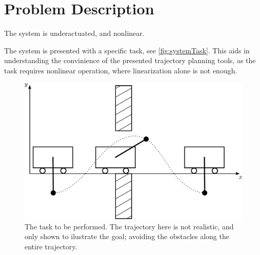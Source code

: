 \section{Problem Description}\label{sec:problemDescription}

The system is underactuated, and nonlinear.



The system is presented with a specific task, see \autoref{fig:systemTask}. This aids in understanding the convinience of the presented trajectory planning tools, as the task requires nonlinear operation, where linearization alone is not enough.

\begin{figure}[H]
  \includegraphics[width=.6\textwidth]{figures/systemTask}
  \caption{The task to be performed. The trajectory here is not realistic, and only shown to ilustrate the goal; avoiding the obstacles along the entire trajectory.}
  \label{fig:systemTask}
\end{figure}

